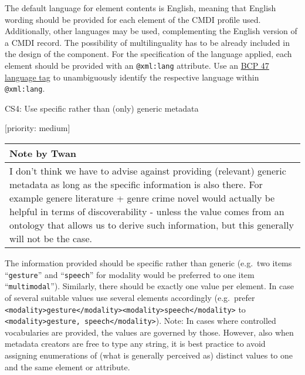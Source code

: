 \documentclass[]{article}
\begin{document}
The default language for element contents is English, meaning that
English wording should be provided for each element of the CMDI profile
used. Additionally, other languages may be used, complementing the
English version of a CMDI record. The possibility of multilinguality has
to be already included in the design of the component. For the
specification of the language applied, each element should be provided
with an \texttt{@xml:lang} attribute. Use an
\href{https://tools.ietf.org/rfc/bcp/bcp47.txt}{BCP 47}
\href{https://tools.ietf.org/rfc/bcp/bcp47.txt}{language tag} to
unambiguously identify the respective language within
\texttt{@xml:lang}.

CS4: Use specific rather than (only) generic metadata

{[}priority: medium{]}

\begin{longtable}[c]{@{}l@{}}
\toprule
\begin{minipage}[b]{0.07\columnwidth}\raggedright\strut
Note by Twan
\strut\end{minipage}\tabularnewline
\midrule
\endhead
\begin{minipage}[t]{0.07\columnwidth}\raggedright\strut
I don't think we have to advise against providing (relevant) generic
metadata as long as the specific information is also there. For example
genere literature + genre crime novel would actually be helpful in terms
of discoverability - unless the value comes from an ontology that allows
us to derive such information, but this generally will not be the case.
\strut\end{minipage}\tabularnewline
\bottomrule
\end{longtable}

The information provided should be specific rather than generic
(e.g.~two items ``\texttt{gesture}'' and ``\texttt{speech}'' for
modality would be preferred to one item ``\texttt{multimodal}'').
Similarly, there should be exactly one value per element. In case of
several suitable values use several elements accordingly (e.g.~prefer
\texttt{\textless{}modality\textgreater{}gesture\textless{}/modality\textgreater{}\textless{}modality\textgreater{}speech\textless{}/modality\textgreater{}}
to
\texttt{\textless{}modality\textgreater{}gesture,\ speech\textless{}/modality\textgreater{}}).
Note: In cases where controlled vocabularies are provided, the values
are governed by those. However, also when metadata creators are free to
type any string, it is best practice to avoid assigning enumerations of
(what is generally perceived as) distinct values to one and the same
element or attribute.
\end{document}
